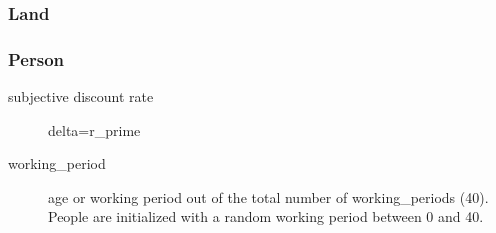 \subsubsection{Land}

\subsubsection{Person}
\begin{description}
\item[subjective discount rate] delta=r\_prime
\item[working\_period] age or working period out of the total number of working\_periods (40). People are initialized with a random working period between 0 and 40.
\end{description}


